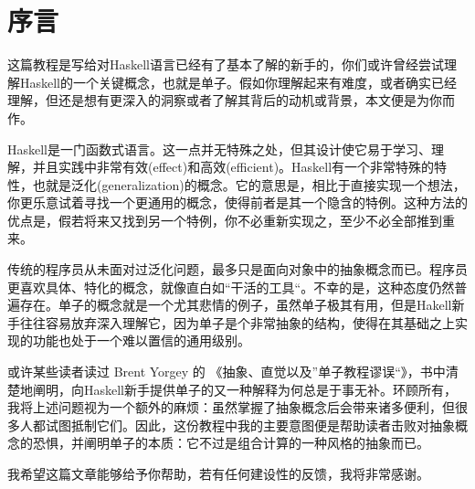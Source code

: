 \section{序言}

这篇教程是写给对Haskell语言已经有了基本了解的新手的，你们或许曾经尝试理解Haskell的一个关键概念，也就是单子。假如你理解起来有难度，或者确实已经理解，但还是想有更深入的洞察或者了解其背后的动机或背景，本文便是为你而作。

Haskell是一门函数式语言。这一点并无特殊之处，但其设计使它易于学习、理解，并且实践中非常有效(effect)和高效(efficient)。Haskell有一个非常特殊的特性，也就是泛化(generalization)的概念。它的意思是，相比于直接实现一个想法，你更乐意试着寻找一个更通用的概念，使得前者是其一个隐含的特例。这种方法的优点是，假若将来又找到另一个特例，你不必重新实现之，至少不必全部推到重来。

传统的程序员从未面对过泛化问题，最多只是面向对象中的抽象概念而已。程序员更喜欢具体、特化的概念，就像直白如“干活的工具“。不幸的是，这种态度仍然普遍存在。单子的概念就是一个尤其悲情的例子，虽然单子极其有用，但是Hakell新手往往容易放弃深入理解它，因为单子是个非常抽象的结构，使得在其基础之上实现的功能也处于一个难以置信的通用级别。

或许某些读者读过 Brent Yorgey 的 《抽象、直觉以及”单子教程谬误“》，书中清楚地阐明，向Haskell新手提供单子的又一种解释为何总是于事无补。环顾所有，我将上述问题视为一个额外的麻烦：虽然掌握了抽象概念后会带来诸多便利，但很多人都试图抵制它们。因此，这份教程中我的主要意图便是帮助读者击败对抽象概念的恐惧，并阐明单子的本质：它不过是组合计算的一种风格的抽象而已。

我希望这篇文章能够给予你帮助，若有任何建设性的反馈，我将非常感谢。